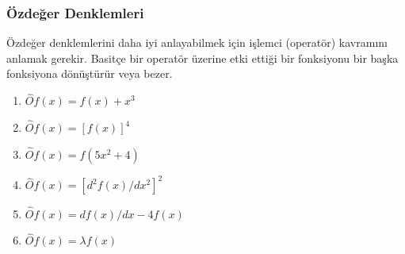 \documentclass[00_kitap.tex]{subfiles}
\begin{document}
\subsubsection{Özdeğer Denklemleri}

Özdeğer denklemlerini daha iyi anlayabilmek için işlemci (operatör) kavramını anlamak gerekir. Basitçe bir operatör üzerine etki ettiği bir fonksiyonu bir başka fonksiyona dönüştürür veya bezer. 
%
\begin{center}
\begin{minipage}{.5\textwidth}
\begin{enumerate}[itemsep=1pt]
\item $\hat O f ( x ) = f ( x ) + x ^ { 3 }  $ 
\item $\hat O f ( x ) = [ f ( x ) ] ^ { 4 }  $ 
\item $\hat O f ( x ) = f ( 5 x^2 + 4 )  $ 
\item $\hat O f ( x ) = [ d^2 f ( x ) / d x^2 ] ^ { 2 }  $
\item $\hat O f ( x ) = d f ( x ) / d x - 4 f ( x )  $
\item $\hat O f ( x ) = \lambda f ( x )$
\end{enumerate}
\end{minipage}
\end{center}
\end{document}
